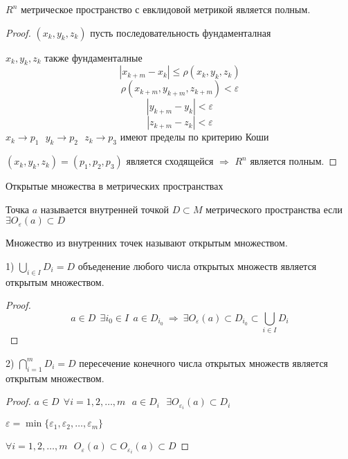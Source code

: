 \begin{theorem}
  $R^n$ метрическое пространство с евклидовой метрикой является полным.
\end{theorem}

\begin{proof}
  $(x_k, y_k, z_k)$ пусть последовательность фундаменталная

  $x_k, y_k, z_k$ также фундаменталные
  $$
  |x_{k+m} - x_k| \le \rho(x_k, y_k, z_k)
  $$
  $$
  \rho(x_{k+m}, y_{k+m}, z_{k+m}) < \varepsilon
  $$
  $$
  |y_{k+m} - y_k| < \varepsilon
  $$
  $$
  |z_{k+m} - z_k| < \varepsilon
  $$
  $x_k \to p_1 ~~~ y_k \to p_2 ~~~ z_k \to p_3$ имеют пределы по критерию Коши

  $(x_k, y_k, z_k) = (p_1, p_2, p_3)$ является сходящейся $\Rightarrow$ $R^n$
  является полным.
\end{proof}

\begin{title}[\Large]
  Открытые множества в метрических пространствах
\end{title}

\begin{define}
  Точка $a$ называется внутренней точкой $D \subset M$ метрического
  пространства если  $\exists O_{\varepsilon}(a) \subset D$
\end{define}

\begin{define}
  Множество из внутренних точек называют открытым множеством.
\end{define}

\begin{block}[Свойства]
  1) $\bigcup_{i \in I} D_i = D$ объеденение любого числа открытых множеств
  является открытым множеством.

  \begin{proof}
    $$
    a \in D ~~ \exists i_0 \in I ~~ a \in D_{i_0} ~ \Rightarrow ~
    \exists O_{\varepsilon}(a) \subset D_{i_0} \subset \bigcup_{i \in I} D_i
    $$
  \end{proof}

  2) $\bigcap_{i=1}^m D_i = D$ пересечение конечного числа открытых
  множеств является открытым множеством.

  \begin{proof}
    $a \in D ~~ \forall i = 1, 2, \ldots, m ~~~ a \in D_i ~~~
    \exists O_{\varepsilon_i}(a) \subset D_i$

    $\varepsilon = \min \{\varepsilon_1, \varepsilon_2, \ldots, \varepsilon_m\}$

    $\forall i = 1, 2, \ldots, m ~~~
    O_{\varepsilon}(a) \subset O_{\varepsilon_i}(a) \subset D$
  \end{proof}
\end{block}

